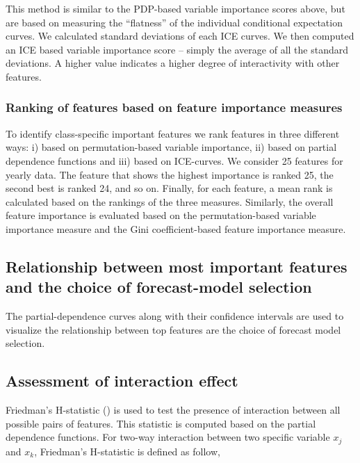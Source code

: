 \documentclass[11pt,a4paper,]{article}
\begin{document}
This method is similar to the PDP-based variable importance scores
above, but are based on measuring the ``flatness'' of the individual
conditional expectation curves. We calculated standard deviations of
each ICE curves. We then computed an ICE based variable importance score
-- simply the average of all the standard deviations. A higher value
indicates a higher degree of interactivity with other features.

\subsubsection{Ranking of features based on feature importance
measures}\label{ranking-of-features-based-on-feature-importance-measures}

To identify class-specific important features we rank features in three
different ways: i) based on permutation-based variable importance, ii)
based on partial dependence functions and iii) based on ICE-curves. We
consider 25 features for yearly data. The feature that shows the highest
importance is ranked 25, the second best is ranked 24, and so on.
Finally, for each feature, a mean rank is calculated based on the
rankings of the three measures. Similarly, the overall feature
importance is evaluated based on the permutation-based variable
importance measure and the Gini coefficient-based feature importance
measure.

\subsection{Relationship between most important features and the choice
of forecast-model
selection}\label{relationship-between-most-important-features-and-the-choice-of-forecast-model-selection}

The partial-dependence curves along with their confidence intervals are
used to visualize the relationship between top features are the choice
of forecast model selection.

\subsection{Assessment of interaction
effect}\label{assessment-of-interaction-effect}

Friedman's H-statistic (\textcite{friedman2008predictive}) is used to
test the presence of interaction between all possible pairs of features.
This statistic is computed based on the partial dependence functions.
For two-way interaction between two specific variable \(x_j\) and
\(x_k\), Friedman's H-statistic is defined as follow,
\end{document}
